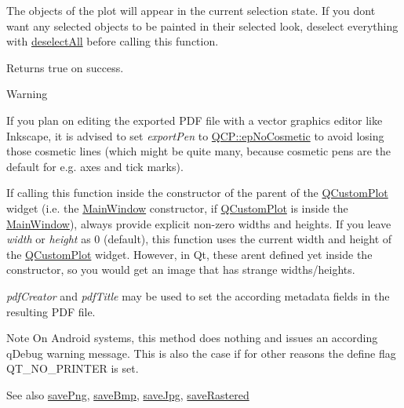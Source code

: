The objects of the plot will appear in the current selection state. If you don\textquotesingle{}t want any selected objects to be painted in their selected look, deselect everything with \hyperlink{classQCustomPlot_a9d4808ab925b003054085246c92a257c}{deselect\+All} before calling this function.

Returns true on success.

\begin{DoxyWarning}{Warning}
\begin{DoxyItemize}
\item If you plan on editing the exported P\+DF file with a vector graphics editor like Inkscape, it is advised to set {\itshape export\+Pen} to \hyperlink{namespaceQCP_a17844f19e1019693a953e1eb93536d2faae8fcfaafee234ce18558afef83f6a78}{Q\+C\+P\+::ep\+No\+Cosmetic} to avoid losing those cosmetic lines (which might be quite many, because cosmetic pens are the default for e.\+g. axes and tick marks). \item If calling this function inside the constructor of the parent of the \hyperlink{classQCustomPlot}{Q\+Custom\+Plot} widget (i.\+e. the \hyperlink{classMainWindow}{Main\+Window} constructor, if \hyperlink{classQCustomPlot}{Q\+Custom\+Plot} is inside the \hyperlink{classMainWindow}{Main\+Window}), always provide explicit non-\/zero widths and heights. If you leave {\itshape width} or {\itshape height} as 0 (default), this function uses the current width and height of the \hyperlink{classQCustomPlot}{Q\+Custom\+Plot} widget. However, in Qt, these aren\textquotesingle{}t defined yet inside the constructor, so you would get an image that has strange widths/heights.\end{DoxyItemize}
{\itshape pdf\+Creator} and {\itshape pdf\+Title} may be used to set the according metadata fields in the resulting P\+DF file.
\end{DoxyWarning}
\begin{DoxyNote}{Note}
On Android systems, this method does nothing and issues an according q\+Debug warning message. This is also the case if for other reasons the define flag {\ttfamily Q\+T\+\_\+\+N\+O\+\_\+\+P\+R\+I\+N\+T\+ER} is set.
\end{DoxyNote}
\begin{DoxySeeAlso}{See also}
\hyperlink{classQCustomPlot_ac92cc9256d12f354b40a4be4600b5fb9}{save\+Png}, \hyperlink{classQCustomPlot_ae3a86ed0795670e50afa21759d4fa13d}{save\+Bmp}, \hyperlink{classQCustomPlot_a76f0d278e630a711fa6f48048cfd83e4}{save\+Jpg}, \hyperlink{classQCustomPlot_ad7723ce2edfa270632ef42b03a444352}{save\+Rastered} 
\end{DoxySeeAlso}

